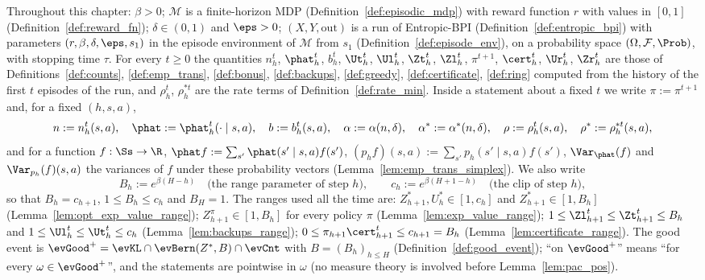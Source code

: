 Throughout this chapter: $\beta > 0$; $\mathcal M$ is a finite-horizon MDP
(Definition~\ref{def:episodic_mdp}) with reward function $r$ with values in $[0, 1]$
(Definition~\ref{def:reward_fn}); $\delta \in (0, 1)$ and $\eps > 0$; $(X, Y, \mathrm{out})$ is a run
of Entropic-BPI (Definition~\ref{def:entropic_bpi}) with parameters $(r, \beta, \delta, \eps, s_1)$
in the episode environment of $\mathcal M$ from $s_1$ (Definition~\ref{def:episode_env}), on a
probability space $(\Omega, \mathcal F, \Prob)$, with stopping time $\tau$. For every $t \ge 0$ the
quantities $n_h^t$, $\phat_h^t$, $b_h^t$, $\Ut_h^t$, $\Ul_h^t$, $\Zt_h^t$, $\Zl_h^t$, $\pi^{t+1}$,
$\cert_h^t$, $\Ur_h^t$, $\Zr_h^t$ are those of Definitions~\ref{def:counts}, \ref{def:emp_trans},
\ref{def:bonus}, \ref{def:backups}, \ref{def:greedy}, \ref{def:certificate}, \ref{def:ring}
computed from the history of the first $t$ episodes of the run, and $\rho_h^t$, $\rho^{*t}_h$
are the rate terms of Definition~\ref{def:rate_min}. Inside a statement about a fixed $t$ we
write $\pi := \pi^{t+1}$ and, for a fixed $(h, s, a)$,
\[
  n := n_h^t(s,a), \quad \phat := \phat_h^t(\cdot \mid s, a), \quad b := b_h^t(s,a), \quad
  \alpha := \alpha(n, \delta), \quad \alpha^* := \alpha^*(n, \delta), \quad
  \rho := \rho_h^t(s,a), \quad \rho^* := \rho^{*t}_h(s,a),
\]
and for a function $f : \Ss \to \R$, $\phat f := \sum_{s'} \phat(s' \mid s,a) f(s')$,
$(p_h f)(s,a) := \sum_{s'} p_h(s' \mid s,a) f(s')$, $\Var_{\phat}(f)$ and $\Var_{p_h}(f)(s,a)$
the variances of $f$ under these probability vectors (Lemma~\ref{lem:emp_trans_simplex}).
We also write
\[
  B_h := e^{\beta (H - h)} \quad \text{(the range parameter of step $h$)}, \qquad
  c_h := e^{\beta (H + 1 - h)} \quad \text{(the clip of step $h$)},
\]
so that $B_h = c_{h+1}$, $1 \le B_h \le c_h$ and $B_H = 1$. The ranges used all the time are:
$Z^*_{h+1}, U^*_h \in [1, c_h]$ and $Z^*_{h+1} \in [1, B_h]$ (Lemma~\ref{lem:opt_exp_value_range});
$Z^\pi_{h+1} \in [1, B_h]$ for every policy $\pi$ (Lemma~\ref{lem:exp_value_range});
$1 \le \Zl_{h+1}^t \le \Zt_{h+1}^t \le B_h$ and $1 \le \Ul_h^t \le \Ut_h^t \le c_h$
(Lemma~\ref{lem:backups_range}); $0 \le \pi_{h+1}\cert_{h+1}^t \le c_{h+1} = B_h$
(Lemma~\ref{lem:certificate_range}). The good event is $\evGood^+ = \evKL \cap \evBern(Z^*, B) \cap \evCnt$
with $B = (B_h)_{h \le H}$ (Definition~\ref{def:good_event}); ``on $\evGood^+$'' means ``for every
$\omega \in \evGood^+$'', and the statements are pointwise in $\omega$ (no measure theory is
involved before Lemma~\ref{lem:pac_pos}).

